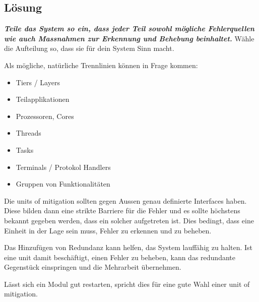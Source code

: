\subsection*{Lösung}

\textbf{\textit{Teile das System so ein, dass jeder Teil sowohl mögliche Fehlerquellen wie auch Massnahmen zur Erkennung und Behebung beinhaltet.}} Wähle die Aufteilung so, dass sie für dein System Sinn macht.

Als mögliche, natürliche Trennlinien können in Frage kommen:
\begin{itemize}
	\item Tiers / Layers
	\item Teilapplikationen
	\item Prozessoren, Cores
	\item Threads
	\item Tasks
	\item Terminals / Protokol Handlers
	\item Gruppen von Funktionalitäten
\end{itemize}

Die units of mitigation sollten gegen Aussen genau definierte Interfaces haben. Diese bilden dann eine strikte Barriere für die Fehler und es sollte höchstens bekannt gegeben werden, dass ein solcher aufgetreten ist. Dies bedingt, dass eine Einheit in der Lage sein muss, Fehler zu erkennen und zu beheben.

Das Hinzufügen von Redundanz kann helfen, das System lauffähig zu halten. Ist eine unit damit beschäftigt, einen Fehler zu beheben, kann das redundante Gegenstück einspringen und die Mehrarbeit übernehmen.

Lässt sich ein Modul gut restarten, spricht dies für eine gute Wahl einer unit of mitigation.



